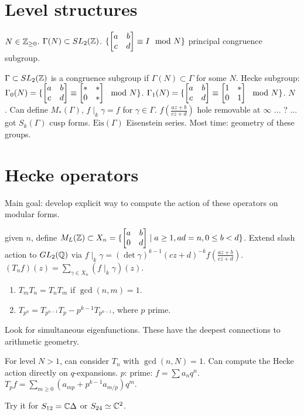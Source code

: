\documentclass[]{article}
\begin{document}
\section*{Level structures}

$N\in \mathbb{Z}_{\geq 0}$. $\Gamma(N) \subset SL_2(\mathbb{Z})$. $\{\begin{bmatrix}a & b \\ c&d\end{bmatrix} \equiv I\mod N \}$ principal congruence subgroup.

\begin{definition}
	$\Gamma \subset SL_2(\mathbb{Z})$ is a congruence subgroup if $\Gamma(N) \subset \Gamma$ for some $N$. Hecke subgroup: $\Gamma_0(N) = \{\begin{bmatrix}a & b \\ c & d\end{bmatrix} \equiv \begin{bmatrix}* & * \\ 0 & *\end{bmatrix} \mod N \}$.
	$\Gamma_1(N) = \{\begin{bmatrix}a & b \\ c & d\end{bmatrix} \equiv \begin{bmatrix}1 & * \\ 0 & 1\end{bmatrix} \mod N \}$.
	$N$ . Can define $M_*(\Gamma)$, $f\mid_k \gamma = f$ for $\gamma \in \Gamma$. $f(\frac{az+b}{cz+d})$ hole removable at $\infty$ ... ? ... got $S_k(\Gamma)$ cusp forms. $\text{Eis}(\Gamma)$ Eisenstein series. Most time: geometry of these groups.
\end{definition}

\section*{Hecke operators}

Main goal: develop explicit way to compute the action of these operators on modular forms.

\begin{definition}
	[today] given $n$, define $M_L(\mathbb{Z}) \subset X_n = \{ \begin{bmatrix}a & b \\ 0 & d\end{bmatrix} \mid a \geq 1, ad = n, 0\leq b < d \}$. Extend slash action to $GL_2(\mathbb{Q})$ via $f\mid_k \gamma = (\det \gamma)^{k-1} (cz+d)^{-k} f(\frac{az+b}{cz+d})$.
	$(T_n f)(z) = \sum_{\gamma \in X_n} (f\mid_k \gamma)(z)$.
		\begin{enumerate}
			\item $T_m T_n = T_n T_m$ if $\gcd(n,m) = 1$.
			\item $T_{p^n} = T_{p^{n-1}} T_p - p^{k-1} T_{p^{n-1}}$, where $p$ prime.
		\end{enumerate}
		Look for simultaneous eigenfunctions. These have the deepest connections to arithmetic geometry.

	For level $N>1$, can consider $T_n$ with $\gcd(n,N) = 1$. Can compute the Hecke action directly on $q$-expansions. $p$: prime: $f = \sum a_n q^n$. $T_p f = \sum_{m\geq 0} (a_{mp}+ p^{k-1} a_{m/p}) q^m$.
\end{definition}
\begin{example}
	Try it for $S_{12} = \mathbb{C} \Delta$ or $S_{24} \simeq \mathbb{C}^2$.
\end{example}
\end{document}
